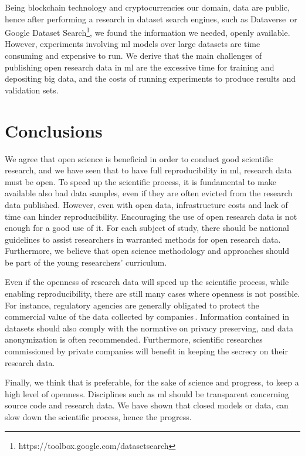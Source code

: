 Being blockchain technology and cryptocurrencies our domain,
data are public, hence after performing a research in dataset search engines, such as
Dataverse\,\cite{crosas2011dataverse} or Google Dataset
Search\footnote{https://toolbox.google.com/datasetsearch},
we found the information we needed, openly available. However, experiments involving \ac{ml} models
over large datasets are time consuming and expensive to run. We derive that the main
challenges of publishing open research data in \ac{ml} are the excessive time for training and
depositing big data, and the costs of running experiments to produce results and validation sets.

\section{Conclusions}
We agree that open science is beneficial in order to conduct good scientific research,
and we have seen that to have full reproducibility in \ac{ml}, research data must be open.
To speed up the scientific process, it is fundamental to make available also bad data samples, even if
they are often evicted from the research data published.
However, even with open data, infrastructure costs and lack of time can hinder reproducibility.
Encouraging the use of open research data is not enough for a good use of it. For each subject of study,
there should be national guidelines to assist researchers in warranted methods for open research data.
Furthermore, we believe that open science methodology and approaches should
be part of the young researchers' curriculum.

Even if the openness of research data will speed up the scientific process,
while enabling reproducibility, there are still many cases where openness is not
possible. For instance, regulatory agencies are generally obligated to protect the commercial
value of the data collected by companies\,\cite{national2016principles}.
Information contained in datasets should also comply with the normative on privacy preserving,
and data anonymization is often recommended. Furthermore, scientific researches
commissioned by private companies will benefit in keeping the secrecy on their research data.

Finally, we think that is preferable, for the sake of science and progress, to keep a high
level of openness. Disciplines such as \ac{ml} should be transparent concerning source code
and research data. We have shown that closed models or data, can slow
down the scientific process, hence the progress.



